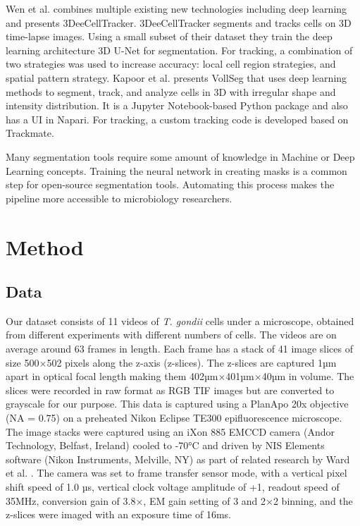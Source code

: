 \documentclass[./dissertation.tex]{subfiles}
\begin{document}
Wen et al. \cite{Wen2021-bn} combines multiple existing new technologies including deep learning and presents 3DeeCellTracker. 3DeeCellTracker segments and tracks cells on 3D time-lapse images. Using a small subset of their dataset they train the deep learning architecture 3D U-Net for segmentation. For tracking, a combination of two strategies was used to increase accuracy: local cell region strategies, and spatial pattern strategy. Kapoor et al. \cite{kapoor2021cell} presents VollSeg that uses deep learning methods to segment, track, and analyze cells in 3D with irregular shape and intensity distribution. It is a Jupyter Notebook-based Python package and also has a UI in Napari. For tracking, a custom tracking code is developed based on Trackmate.

Many segmentation tools require some amount of knowledge in Machine or Deep Learning concepts. Training the neural network in creating masks is a common step for open-source segmentation tools. Automating this process makes the pipeline more accessible to microbiology researchers.

\section{Method}
\subsection{Data}
Our dataset consists of 11 videos of \textit{T. gondii} cells under a microscope, obtained from different experiments with different numbers of cells. The videos are on average around 63 frames in length. Each frame has a stack of 41 image slices of size 500×502 pixels along the z-axis (z-slices). The z-slices are captured 1µm apart in optical focal length making them 402µm×401µm×40µm in volume. The slices were recorded in raw format as RGB TIF images but are converted to grayscale for our purpose. This data is captured using a PlanApo 20x objective (NA = 0.75) on a preheated Nikon Eclipse TE300 epifluorescence microscope. The image stacks were captured using an iXon 885 EMCCD camera (Andor Technology, Belfast, Ireland) cooled to -70°C and driven by NIS Elements software (Nikon Instruments, Melville, NY) as part of related research by Ward et al. \cite{TgPHIL1}. The camera was set to frame transfer sensor mode, with a vertical pixel shift speed of 1.0 µs, vertical clock voltage amplitude of +1, readout speed of 35MHz, conversion gain of 3.8×, EM gain setting of 3 and 2×2 binning, and the z-slices were imaged with an exposure time of 16ms.
\end{document}
